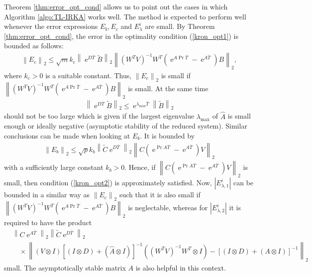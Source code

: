 \documentclass[a4paper,11pt, twoside]{article}
\newcommand{\expn}{\operatorname{e}}
\newcommand{\pro}{\operatorname{Pr}}
\begin{document}
Theorem \ref{thm:error_opt_cond} allows us to point out the cases in which Algorithm \ref{algo:TL-IRKA} works well. The method is expected to perform 
well whenever the error expressions $E_b, E_c$ and $E^i_\lambda$ are small. By Theorem \ref{thm:error_opt_cond}, the error in the 
optimality condition (\ref{kron_opt1}) is bounded as follows:\begin{align*}
   \left\|E_c\right\|_2 \leq   \sqrt{m}k_c\left\|\expn^{D \bar T}\tilde B \right\|_2 \left\|(W^TV)^{-1}W^T(\expn^{A 
\pro\bar T}-\expn^{A \bar T}) B\right\|_2,                       
                                       \end{align*}
where $k_c>0$ is a suitable constant. Thus, $\left\|E_c\right\|_2$ is small if $\left\|(W^TV)^{-1}W^T(\expn^{A \pro\bar T}-\expn^{A \bar T}) 
B\right\|_2$ is small. At the same time \begin{align*}
                \left\|\expn^{D \bar T}\tilde B \right\|_2\leq \expn^{\lambda_{\max} \bar T}\left\|\tilde B \right\|_2
                \end{align*}
should not be too large which is given if the largest eigenvalue $\lambda_{\max}$ of $\hat A$ is small enough or ideally negative (asymptotic 
stability of the reduced system). Similar conclusions can be made when looking at $E_b$. It is bounded by \begin{align*}
   \left\|E_b\right\|_2 \leq   \sqrt{p}k_b\left\|\tilde C \expn^{D \bar T} \right\|_2 \left\|C(\expn^{\pro A\bar T}-\expn^{A \bar T})V\right\|_2     
                                   \end{align*}  
with a sufficiently large constant $k_b>0$. Hence, if $\left\|C(\expn^{\pro A\bar T}-\expn^{A \bar T})V\right\|_2$ is small, then condition 
(\ref{kron_opt2}) is approximately satisfied. Now, $\left\vert E_{\lambda, 1}^i\right\vert$ can be bounded in a similar way as $\left\|E_c\right\|_2$ 
such that it is also small if $\left\|(W^TV)^{-1}W^T(\expn^{A \pro\bar T}-\expn^{A \bar T}) B\right\|_2$ is neglectable, whereas for $\left\vert 
E_{\lambda, 2}^i\right\vert$ it is required to have the product \begin{align*}
&\left\|C \expn^{A \bar T}\right\|_2 \left\|\tilde C \expn^{D \bar T}\right\|_2\\&\quad \times
\left\| (V\otimes I) \left[(I\otimes D)+(\hat A\otimes I)\right]^{-1} ((W^T V)^{-1}W^T \otimes I)- \left[(I\otimes D)+(A\otimes 
I)\right]^{-1}\right\|_2                          
                               \end{align*}
small. The asymptotically stable matrix $A$ is also helpful in this context.
\end{document}
